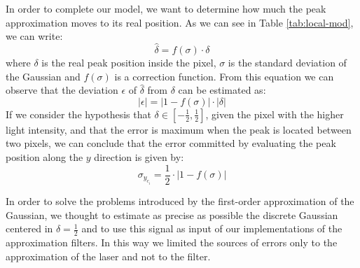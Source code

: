 In order to complete our model, we want to determine how much the peak approximation moves to its real position. As we can see in Table \ref{tab:local-mod}, we can write:
  \begin{equation*}
    \hat{\delta} = f(\sigma) \cdot \delta
  \end{equation*}
where $\delta$ is the real peak position inside the pixel, $\sigma$ is the standard deviation of the Gaussian and $f(\sigma)$ is a correction function. From this equation we can observe that the deviation $\epsilon$ of $\hat{\delta}$ from $\delta$ can be estimated as:
  \begin{equation*}
    \left| \epsilon \right| = \left| 1 - f(\sigma) \right| \cdot \left| \delta \right|
  \end{equation*}
If we consider the hypothesis that $\delta \in \left[ -\frac{1}{2}, \frac{1}{2}\right]$, given the pixel with the higher light intensity, and that the error is maximum when the peak is located between two pixels, we can conclude that the error committed by evaluating the peak position along the $y$ direction is given by:
  \begin{equation*}
    \sigma_{y_{c_i}} = \frac{1}{2} \cdot \left| 1 - f(\sigma) \right|
  \end{equation*}

In order to solve the problems introduced by the first-order approximation of the Gaussian, we thought to estimate as precise as possible the discrete Gaussian centered in $\delta = \frac{1}{2}$ and to use this signal as input of our implementations of the approximation filters. In this way we limited the sources of errors only to the approximation of the laser and not to the filter. \\

